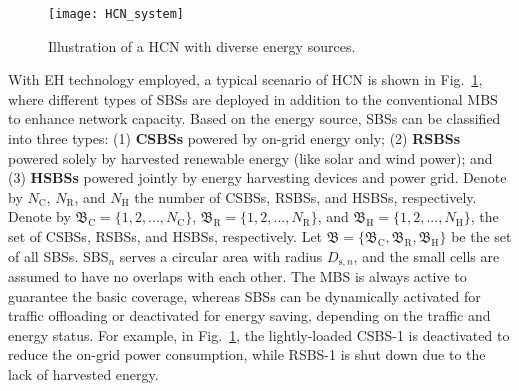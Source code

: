\documentclass[12pt, draftclsnofoot,onecolumn]{IEEEtran}
\begin{document}
\begin{figure}
  \centering
  \texttt{[image: HCN\_system]}\\
  \caption{Illustration of a HCN with diverse energy sources.}\label{fig_HCN}
\end{figure}

With EH technology employed, a typical scenario of HCN is shown in Fig.~\ref{fig_HCN}, where different types of SBSs are deployed in addition to the conventional MBS to enhance network capacity.
Based on the energy source, SBSs can be classified into three types: (1) \textbf{CSBSs} powered by on-grid energy only; (2) \textbf{RSBSs} powered solely by harvested renewable energy (like solar and wind power); and (3) \textbf{HSBSs} powered jointly by energy harvesting devices and power grid.
Denote by $N_\mathrm{C}$, $N_\mathrm{R}$, and $N_\mathrm{H}$ the number of CSBSs, RSBSs, and HSBSs, respectively.
Denote by $\mathfrak{B}_\mathrm{C} = \{1,2,...,N_\mathrm{C}\}$, $\mathfrak{B}_\mathrm{R} = \{1,2,...,N_\mathrm{R}\}$, and $\mathfrak{B}_\mathrm{H} = \{1,2,...,N_\mathrm{H}\}$, the set of CSBSs, RSBSs, and HSBSs, respectively.
Let $\mathfrak{B} = \{\mathfrak{B}_\mathrm{C}, \mathfrak{B}_\mathrm{R}, \mathfrak{B}_\mathrm{H}\}$ be the set of all SBSs. 
SBS$_n$ serves a circular area with radius $D_{\mathrm{s},n}$, and the small cells are assumed to have no overlaps with each other.
The MBS is always active to guarantee the basic coverage, whereas SBSs can be dynamically activated for traffic offloading or deactivated for energy saving, depending on the traffic and energy status.
For example, in Fig.~\ref{fig_HCN}, the lightly-loaded CSBS-1 is deactivated to reduce the on-grid power consumption, while RSBS-1 is shut down due to the lack of harvested energy.
\end{document}
